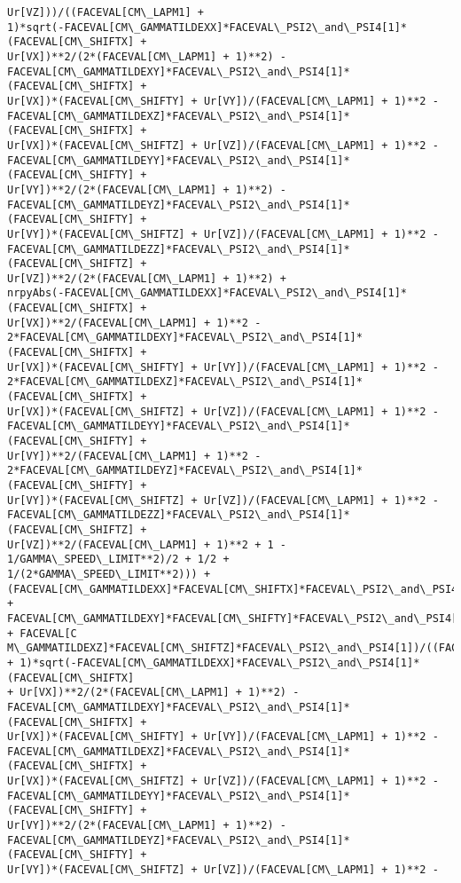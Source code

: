 \documentclass[landscape,letterpaper,10pt,english]{article}
\begin{document}
\begin{Verbatim}[commandchars=\\\{\}]
Ur[VZ]))/((FACEVAL[CM\_LAPM1] +
1)*sqrt(-FACEVAL[CM\_GAMMATILDEXX]*FACEVAL\_PSI2\_and\_PSI4[1]*(FACEVAL[CM\_SHIFTX] +
Ur[VX])**2/(2*(FACEVAL[CM\_LAPM1] + 1)**2) -
FACEVAL[CM\_GAMMATILDEXY]*FACEVAL\_PSI2\_and\_PSI4[1]*(FACEVAL[CM\_SHIFTX] +
Ur[VX])*(FACEVAL[CM\_SHIFTY] + Ur[VY])/(FACEVAL[CM\_LAPM1] + 1)**2 -
FACEVAL[CM\_GAMMATILDEXZ]*FACEVAL\_PSI2\_and\_PSI4[1]*(FACEVAL[CM\_SHIFTX] +
Ur[VX])*(FACEVAL[CM\_SHIFTZ] + Ur[VZ])/(FACEVAL[CM\_LAPM1] + 1)**2 -
FACEVAL[CM\_GAMMATILDEYY]*FACEVAL\_PSI2\_and\_PSI4[1]*(FACEVAL[CM\_SHIFTY] +
Ur[VY])**2/(2*(FACEVAL[CM\_LAPM1] + 1)**2) -
FACEVAL[CM\_GAMMATILDEYZ]*FACEVAL\_PSI2\_and\_PSI4[1]*(FACEVAL[CM\_SHIFTY] +
Ur[VY])*(FACEVAL[CM\_SHIFTZ] + Ur[VZ])/(FACEVAL[CM\_LAPM1] + 1)**2 -
FACEVAL[CM\_GAMMATILDEZZ]*FACEVAL\_PSI2\_and\_PSI4[1]*(FACEVAL[CM\_SHIFTZ] +
Ur[VZ])**2/(2*(FACEVAL[CM\_LAPM1] + 1)**2) +
nrpyAbs(-FACEVAL[CM\_GAMMATILDEXX]*FACEVAL\_PSI2\_and\_PSI4[1]*(FACEVAL[CM\_SHIFTX] +
Ur[VX])**2/(FACEVAL[CM\_LAPM1] + 1)**2 -
2*FACEVAL[CM\_GAMMATILDEXY]*FACEVAL\_PSI2\_and\_PSI4[1]*(FACEVAL[CM\_SHIFTX] +
Ur[VX])*(FACEVAL[CM\_SHIFTY] + Ur[VY])/(FACEVAL[CM\_LAPM1] + 1)**2 -
2*FACEVAL[CM\_GAMMATILDEXZ]*FACEVAL\_PSI2\_and\_PSI4[1]*(FACEVAL[CM\_SHIFTX] +
Ur[VX])*(FACEVAL[CM\_SHIFTZ] + Ur[VZ])/(FACEVAL[CM\_LAPM1] + 1)**2 -
FACEVAL[CM\_GAMMATILDEYY]*FACEVAL\_PSI2\_and\_PSI4[1]*(FACEVAL[CM\_SHIFTY] +
Ur[VY])**2/(FACEVAL[CM\_LAPM1] + 1)**2 -
2*FACEVAL[CM\_GAMMATILDEYZ]*FACEVAL\_PSI2\_and\_PSI4[1]*(FACEVAL[CM\_SHIFTY] +
Ur[VY])*(FACEVAL[CM\_SHIFTZ] + Ur[VZ])/(FACEVAL[CM\_LAPM1] + 1)**2 -
FACEVAL[CM\_GAMMATILDEZZ]*FACEVAL\_PSI2\_and\_PSI4[1]*(FACEVAL[CM\_SHIFTZ] +
Ur[VZ])**2/(FACEVAL[CM\_LAPM1] + 1)**2 + 1 - 1/GAMMA\_SPEED\_LIMIT**2)/2 + 1/2 +
1/(2*GAMMA\_SPEED\_LIMIT**2))) +
(FACEVAL[CM\_GAMMATILDEXX]*FACEVAL[CM\_SHIFTX]*FACEVAL\_PSI2\_and\_PSI4[1] +
FACEVAL[CM\_GAMMATILDEXY]*FACEVAL[CM\_SHIFTY]*FACEVAL\_PSI2\_and\_PSI4[1] + FACEVAL[C
M\_GAMMATILDEXZ]*FACEVAL[CM\_SHIFTZ]*FACEVAL\_PSI2\_and\_PSI4[1])/((FACEVAL[CM\_LAPM1]
+ 1)*sqrt(-FACEVAL[CM\_GAMMATILDEXX]*FACEVAL\_PSI2\_and\_PSI4[1]*(FACEVAL[CM\_SHIFTX]
+ Ur[VX])**2/(2*(FACEVAL[CM\_LAPM1] + 1)**2) -
FACEVAL[CM\_GAMMATILDEXY]*FACEVAL\_PSI2\_and\_PSI4[1]*(FACEVAL[CM\_SHIFTX] +
Ur[VX])*(FACEVAL[CM\_SHIFTY] + Ur[VY])/(FACEVAL[CM\_LAPM1] + 1)**2 -
FACEVAL[CM\_GAMMATILDEXZ]*FACEVAL\_PSI2\_and\_PSI4[1]*(FACEVAL[CM\_SHIFTX] +
Ur[VX])*(FACEVAL[CM\_SHIFTZ] + Ur[VZ])/(FACEVAL[CM\_LAPM1] + 1)**2 -
FACEVAL[CM\_GAMMATILDEYY]*FACEVAL\_PSI2\_and\_PSI4[1]*(FACEVAL[CM\_SHIFTY] +
Ur[VY])**2/(2*(FACEVAL[CM\_LAPM1] + 1)**2) -
FACEVAL[CM\_GAMMATILDEYZ]*FACEVAL\_PSI2\_and\_PSI4[1]*(FACEVAL[CM\_SHIFTY] +
Ur[VY])*(FACEVAL[CM\_SHIFTZ] + Ur[VZ])/(FACEVAL[CM\_LAPM1] + 1)**2 -

\end{Verbatim}
\end{document}
